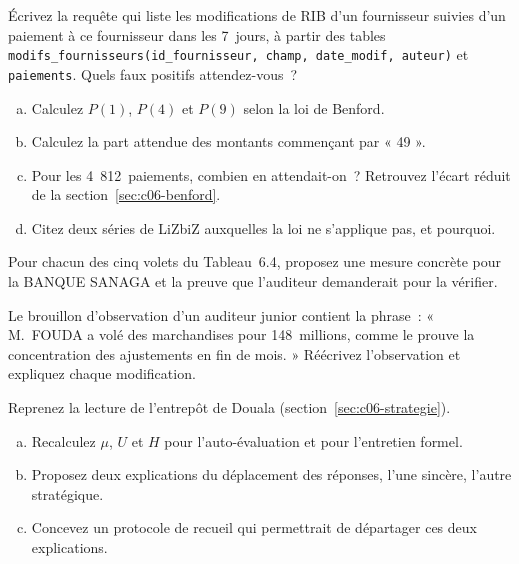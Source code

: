 \begin{boxexo}[title={\ding{45}\quad Exercice~6.4. Écrire une requête \niveaumoyen}]
Écrivez la requête qui liste les modifications de RIB d'un fournisseur
suivies d'un paiement à ce fournisseur dans les 7~jours, à partir des
tables \texttt{modifs\_fournisseurs(id\_fournisseur, champ, date\_modif,
auteur)} et \texttt{paiements}. Quels faux positifs attendez-vous~?
\end{boxexo}

\begin{boxexo}[title={\ding{45}\quad Exercice~6.5. Benford pas à pas \niveaumoyen}]
\begin{enumerate}[(a)]
    \item Calculez $P(1)$, $P(4)$ et $P(9)$ selon la loi de Benford.
    \item Calculez la part attendue des montants commençant par « 49 ».
    \item Pour les 4~812~paiements, combien en attendait-on~? Retrouvez
          l'écart réduit de la section~\ref{sec:c06-benford}.
    \item Citez deux séries de LiZbiZ auxquelles la loi ne s'applique pas,
          et pourquoi.
\end{enumerate}
\end{boxexo}

\begin{boxexo}[title={\ding{45}\quad Exercice~6.6. Un programme anti-fraude \niveaumoyen}]
Pour chacun des cinq volets du Tableau~6.4, proposez une mesure concrète
pour la BANQUE SANAGA et la preuve que l'auditeur demanderait pour la
vérifier.
\end{boxexo}

\begin{boxexo}[title={\ding{45}\quad Exercice~6.7. La constatation de trop \niveaumoyen}]
Le brouillon d'observation d'un auditeur junior contient la phrase~:
« M.~FOUDA a volé des marchandises pour 148~millions, comme le prouve la
concentration des ajustements en fin de mois. » Réécrivez l'observation et
expliquez chaque modification.
\end{boxexo}

\begin{boxexo}[title={\ding{45}\quad Exercice~6.8. Un usage stratégique de \NEK{}~? \niveauexpert}]
Reprenez la lecture de l'entrepôt de Douala (section~\ref{sec:c06-strategie}).
\begin{enumerate}[(a)]
    \item Recalculez $\mu$, $U$ et $H$ pour l'auto-évaluation et pour
          l'entretien formel.
    \item Proposez deux explications du déplacement des réponses, l'une
          sincère, l'autre stratégique.
    \item Concevez un protocole de recueil qui permettrait de départager ces
          deux explications.
\end{enumerate}
\end{boxexo}

